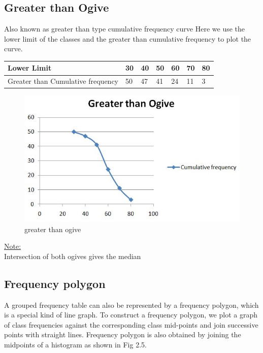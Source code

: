\documentclass[
]{book}
\begin{document}
\hypertarget{greater-than-ogive}{%
\subsection{Greater than Ogive}\label{greater-than-ogive}}

Also known as greater than type cumulative frequency curve Here we use the lower limit of the classes and the greater than cumulative frequency to plot the curve.

\begin{longtable}[]{@{}lllllll@{}}
\toprule
Lower Limit & 30 & 40 & 50 & 60 & 70 & 80 \\
\midrule
\endhead
Greater than Cumulative frequency & 50 & 47 & 41 & 24 & 11 & 3 \\
\bottomrule
\end{longtable}

\begin{figure}

{\centering \includegraphics[width=0.7\linewidth]{images/image10} 

}

\caption{greater than ogive}\label{fig:gco}
\end{figure}

\underline{Note:}\\
Intersection of both ogives gives the median

\hypertarget{frequency-polygon}{%
\subsection{Frequency polygon}\label{frequency-polygon}}

A grouped frequency table can also be represented by a frequency
polygon, which is a special kind of line graph. To construct a frequency
polygon, we plot a graph of class frequencies against the corresponding
class mid-points and join successive points with straight lines. Frequency polygon is also obtained by joining the midpoints of a histogram as shown in Fig 2.5.
\end{document}
